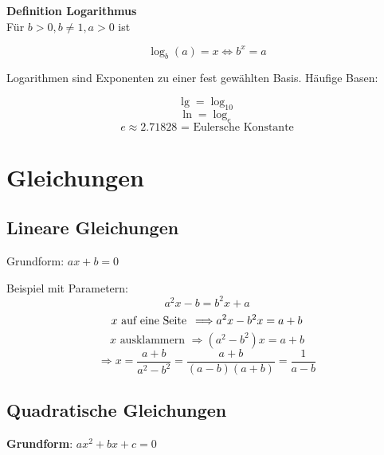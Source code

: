\begin{multicols}{2}
\begin{tcolorbox}[colback=white]
  \textbf{Definition Logarithmus}\\
  Für $b>0, b\ne 1, a>0$ ist

$$\log_b{}(a)=x \Longleftrightarrow{} b^x = a$$
\end{tcolorbox}

Logarithmen sind Exponenten zu einer fest gewählten Basis. Häufige Basen:

$$\lg = \log_{10} $$
$$\ln = \log_e$$
$$e \approx 2.71828 \textrm{ = Eulersche Konstante}$$


\begin{tcolorbox}[colback=white]

\end{tcolorbox}%
%

\section*{Gleichungen}
                
\subsection*{Lineare Gleichungen}
Grundform: $ax+b=0$

Beispiel mit Parametern:
$$a^2x-b=b^2x+a$$
$$x\textrm{ auf eine Seite\, } \Longrightarrow a^2x -b^2x = a+b$$
$$x\textrm{ ausklammern }\Longrightarrow (a^2-b^2)x= a+b$$
$$\Longrightarrow x= \frac{a+b}{a^2-b^2} = \frac{a+b}{(a-b)(a+b)}=\frac{1}{a-b}$$

\subsection*{Quadratische Gleichungen}

\textbf{Grundform}: $ax^2 + bx+c = 0$


\end{multicols}

